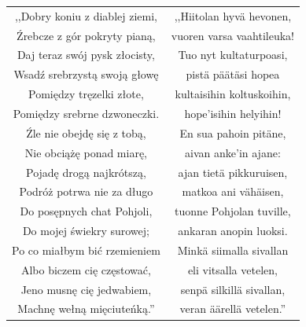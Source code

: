 \documentclass[11pt,a4paper,twoside]{report}
\begin{document}
{\centering
\small
\begin{longtable}{c c}
,,Dobry koniu z diablej ziemi, & ,,Hiitolan hyvä hevonen, \\
Źrebcze z gór pokryty pianą, & vuoren varsa vaahtileuka! \\
Daj teraz swój pysk złocisty, & Tuo nyt kultaturpoasi, \\
Wsadź srebrzystą swoją głowę & pistä päätäsi hopea \\
Pomiędzy tręzelki złote, & kultaisihin koltuskoihin, \\
Pomiędzy srebrne dzwoneczki. & hope'isihin helyihin! \\
Źle nie obejdę się z tobą, & En sua pahoin pitäne, \\
Nie obciążę ponad miarę, & aivan anke'in ajane: \\
Pojadę drogą najkrótszą, & ajan tietä pikkuruisen, \\
Podróż potrwa nie za długo & matkoa ani vähäisen, \\
Do posępnych chat Pohjoli, & tuonne Pohjolan tuville, \\
Do mojej świekry surowej; & ankaran anopin luoksi. \\
Po co miałbym bić rzemieniem & Minkä siimalla sivallan \\
Albo biczem cię częstować, & eli vitsalla vetelen, \\
Jeno musnę cię jedwabiem, & senpä silkillä sivallan, \\
Machnę wełną mięciuteńką.'' & veran äärellä vetelen.'' \\
\end{longtable}
}

\vspace*{0.5\baselineskip}
\end{document}
